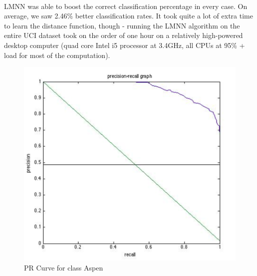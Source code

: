\documentclass[11pt]{article}
\begin{document}
    \paragraph{}
    LMNN was able to boost the correct classification percentage in every case. On average, we saw 2.46\% better classification rates. It took quite a lot of extra time to learn the distance function, though - running the LMNN algorithm on the entire UCI dataset took on the order of one hour on a relatively high-powered desktop computer (quad core Intel i5 processor at 3.4GHz, all CPUs at 95\% + load for most of the computation).
     
     
     
     
    \begin{figure}[htbp]
    \begin{minipage}[b]{\linewidth}
    \centering
    \includegraphics[width=\linewidth]{AspenPRCurve.png}
    \caption{PR Curve for class Aspen}
    \label{fig:chapter001_dist_001}
    \end{minipage}
    \end{figure}
    \hspace{0.5cm}
\end{document}
